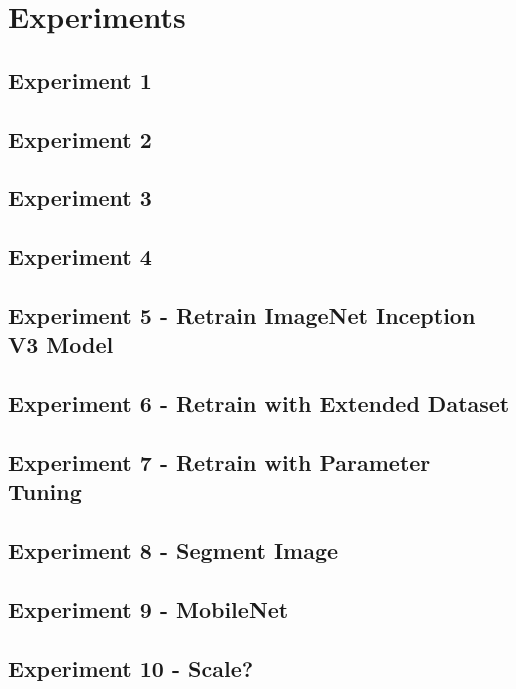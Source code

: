 \chapter{Experiments}
\label{exp}

\section{Experiment 1}


\section{Experiment 2}


\section{Experiment 3}


\section{Experiment 4}


\section{Experiment 5 - Retrain ImageNet Inception V3 Model}


\section{Experiment 6 - Retrain with Extended Dataset}


\section{Experiment 7 - Retrain with Parameter Tuning}


\section{Experiment 8 - Segment Image}


\section{Experiment 9 - MobileNet}


\section{Experiment 10 - Scale?}

